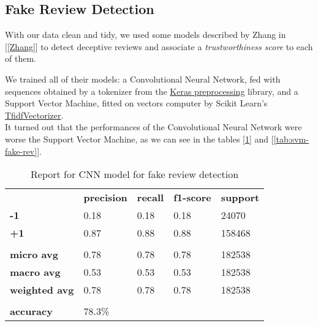 \subsection{Fake Review Detection} \label{sec:fake-rev}

With our data clean and tidy, we used some models described by Zhang in [\ref{Zhang}] to detect deceptive reviews and associate a \textit{trustworthiness score} to each of them.

We trained all of their models: a Convolutional Neural Network, fed with sequences obtained by a tokenizer from the \href{https://keras.io/preprocessing/text/}{Keras preprocessing} library, and a Support Vector Machine, fitted on vectors computer by Scikit Learn's \href{https://scikit-learn.org/stable/modules/generated/sklearn.feature_extraction.text.TfidfVectorizer.html}{TfidfVectorizer}.\\
It turned out that the performances of the Convolutional Neural Network were worse \wrt the Support Vector Machine, as we can see in the tables [\ref{tab:cnn-fake-rev}] and [\ref{tab:svm-fake-rev}].

\begin{table}[h]
	\centering
	\begin{tabular}{lllll}
		\rowcolor[HTML]{EEEEEE} 
		\cellcolor[HTML]{FBFBFB} & \textbf{precision} & \textbf{recall} & \textbf{f1-score} & \textbf{support} \\
		\rowcolor[HTML]{EEEEEE} 
		\textbf{-1}              & 0.18               & 0.18            & 0.18              & 24070            \\
		\rowcolor[HTML]{EEEEEE} 
		\textbf{+1}              & 0.87               & 0.88            & 0.88              & 158468           \\
		\rowcolor[HTML]{FBFBFB} 
		&                    &                 &                   &                  \\
		\rowcolor[HTML]{EEEEEE} 
		\textbf{micro avg}       & 0.78               & 0.78            & 0.78              & 182538           \\
		\rowcolor[HTML]{EEEEEE} 
		\textbf{macro avg}       & 0.53               & 0.53            & 0.53              & 182538           \\
		\rowcolor[HTML]{EEEEEE} 
		\textbf{weighted avg}    & 0.78               & 0.78            & 0.78              & 182538           \\
		\rowcolor[HTML]{FBFBFB} 
		&                    &                 &                   &                  \\
		\rowcolor[HTML]{EEEEEE} 
		\textbf{accuracy}        & \multicolumn{4}{l}{\cellcolor[HTML]{EEEEEE}78.3\%}                         
	\end{tabular}
	\caption{Report for CNN model for fake review detection}
	\label{tab:cnn-fake-rev}
\end{table}

